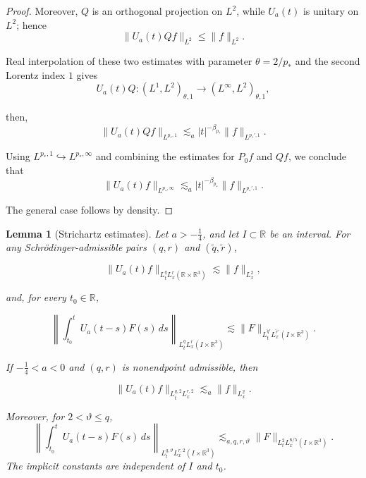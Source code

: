 \documentclass[preprint,12pt]{elsarticle}
\numberwithin{equation}{section}
\newtheorem{lemma}{Lemma}[section]
\theoremstyle{definition}
\theoremstyle{remark}
\newcommand{\R}{\mathbb R}
\newcommand{\norm}[2]{\lVert #1\rVert_{#2}}
\begin{document}
\begin{proof}
Moreover, \(Q\) is an orthogonal projection on \(L^2\), while \(U_a(t)\) is unitary on \(L^2\); hence
\[
\|U_a(t)Qf\|_{L^2}\le \|f\|_{L^2}.
\]

Real interpolation of these two estimates with parameter \(\theta=2/p_*\) and the second Lorentz index \(1\) gives
\[
U_a(t)Q:
(L^1,L^2)_{\theta,1}
\longrightarrow
(L^\infty,L^2)_{\theta,1},
\]

then,
\[
\|U_a(t)Qf\|_{L^{p_*,1}}
\lesssim_a |t|^{-\beta_{p_*}}
\|f\|_{L^{p_*',1}}.
\]

Using \(L^{p_*,1}\hookrightarrow L^{p_*,\infty}\) and combining the estimates for \(P_0f\) and \(Qf\), we conclude that
\[
\|U_a(t)f\|_{L^{p_*,\infty}}
\lesssim_a |t|^{-\beta_{p_*}}
\|f\|_{L^{p_*',1}}.
\]

The general case follows by density.
\end{proof}





\begin{lemma}[Strichartz estimates]
\label{lem:strichartz}
	Let \(a>-\frac14\), and let \(I\subset\mathbb R\) be an interval. For any Schrödinger-admissible pairs \((q,r)\) and \((\widetilde q,\widetilde r)\),
	
	$$
	\|U_a(t)f\|_{L_t^qL_x^r(\mathbb R\times\mathbb R^3)}
	\lesssim \|f\|_{L_x^2},
	$$
	
	and, for every \(t_0\in\mathbb R\),
	
	$$
	\left\|\int_{t_0}^t U_a(t-s)F(s)\,ds\right\|_{L_t^qL_x^r(I\times\mathbb R^3)}
	\lesssim
	\|F\|_{L_t^{\widetilde q'}L_x^{\widetilde r'}(I\times\mathbb R^3)} .
	$$
	
	If \(-\frac14<a<0\) and \((q,r)\) is nonendpoint admissible, then
	
	$$
	\|U_a(t)f\|_{L_t^{q,2}L_x^{r,2}}
	\lesssim_a \|f\|_{L_x^2}.
	$$
	
	Moreover, for \(2<\vartheta\le q\),
\begin{equation}
	\left\|\int_{t_0}^t U_a(t-s)F(s)\,ds\right\|_{
		L_t^{q,\vartheta}L_x^{r,2}(I\times\R^3)}
	\lesssim_{a,q,r,\vartheta}
	\norm{F}{L_t^2L_x^{6/5}(I\times\R^3)}.
	\label{eq:retarded-lorentz}
\end{equation}
	The implicit constants are independent of \(I\) and \(t_0\).
\end{lemma}
\end{document}
